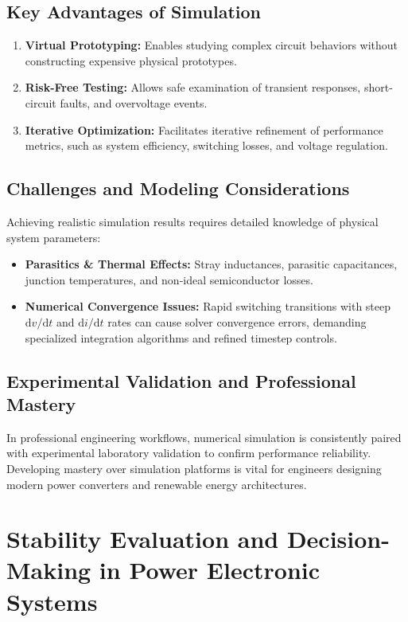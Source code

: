 \documentclass[12pt,a4paper]{article}
\begin{document}
\subsection{Key Advantages of Simulation}
\begin{enumerate}
    \item \textbf{Virtual Prototyping:} Enables studying complex circuit behaviors without constructing expensive physical prototypes.
    \item \textbf{Risk-Free Testing:} Allows safe examination of transient responses, short-circuit faults, and overvoltage events.
    \item \textbf{Iterative Optimization:} Facilitates iterative refinement of performance metrics, such as system efficiency, switching losses, and voltage regulation.
\end{enumerate}

\subsection{Challenges and Modeling Considerations}
Achieving realistic simulation results requires detailed knowledge of physical system parameters:
\begin{itemize}
    \item \textbf{Parasitics \& Thermal Effects:} Stray inductances, parasitic capacitances, junction temperatures, and non-ideal semiconductor losses.
    \item \textbf{Numerical Convergence Issues:} Rapid switching transitions with steep $\mathrm{d}v/\mathrm{d}t$ and $\mathrm{d}i/\mathrm{d}t$ rates can cause solver convergence errors, demanding specialized integration algorithms and refined timestep controls.
\end{itemize}

\subsection{Experimental Validation and Professional Mastery}
In professional engineering workflows, numerical simulation is consistently paired with experimental laboratory validation to confirm performance reliability. Developing mastery over simulation platforms is vital for engineers designing modern power converters and renewable energy architectures.

\section{Stability Evaluation and Decision-Making in Power Electronic Systems}
\end{document}
